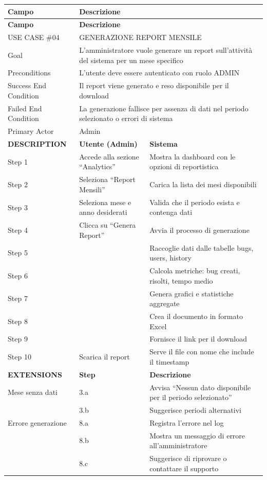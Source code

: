 \begin{longtable}{|p{3cm}|p{7cm}|p{5.5cm}|}
\hline
\textbf{Campo} & \multicolumn{2}{p{12.5cm}|}{\textbf{Descrizione}} \\
\hline
\endfirsthead
\hline
\textbf{Campo} & \multicolumn{2}{p{12.5cm}|}{\textbf{Descrizione}} \\
\hline
\endhead
\hline
\endfoot
\hline
\endlastfoot

USE CASE \#04 & \multicolumn{2}{p{12.5cm}|}{GENERAZIONE REPORT MENSILE} \\
\hline
Goal & \multicolumn{2}{p{12.5cm}|}{L'amministratore vuole generare un report sull'attività del sistema per un mese specifico} \\
\hline
Preconditions & \multicolumn{2}{p{12.5cm}|}{L'utente deve essere autenticato con ruolo ADMIN} \\
\hline
Success End Condition & \multicolumn{2}{p{12.5cm}|}{Il report viene generato e reso disponibile per il download} \\
\hline
Failed End Condition & \multicolumn{2}{p{12.5cm}|}{La generazione fallisce per assenza di dati nel periodo selezionato o errori di sistema} \\
\hline
Primary Actor & \multicolumn{2}{p{12.5cm}|}{Admin} \\
\hline\hline
\textbf{DESCRIPTION} & \textbf{Utente (Admin)} & \textbf{Sistema} \\
\hline
Step 1 & Accede alla sezione ``Analytics'' & Mostra la dashboard con le opzioni di reportistica \\
\hline
Step 2 & Seleziona ``Report Mensili'' & Carica la lista dei mesi disponibili \\
\hline
Step 3 & Seleziona mese e anno desiderati & Valida che il periodo esista e contenga dati \\
\hline
Step 4 & Clicca su ``Genera Report'' & Avvia il processo di generazione \\
\hline
Step 5 & & Raccoglie dati dalle tabelle bugs, users, history \\
\hline
Step 6 & & Calcola metriche: bug creati, risolti, tempo medio \\
\hline
Step 7 & & Genera grafici e statistiche aggregate \\
\hline
Step 8 & & Crea il documento in formato Excel \\
\hline
Step 9 & & Fornisce il link per il download \\
\hline
Step 10 & Scarica il report & Serve il file con nome che include il timestamp \\
\hline\hline
\textbf{EXTENSIONS} & \textbf{Step} & \textbf{Descrizione} \\
\hline
Mese senza dati & 3.a & Avvisa ``Nessun dato disponibile per il periodo selezionato'' \\
\hline
 & 3.b & Suggerisce periodi alternativi \\
\hline
Errore generazione & 8.a & Registra l'errore nel log \\
\hline
 & 8.b & Mostra un messaggio di errore all'amministratore \\
\hline
 & 8.c & Suggerisce di riprovare o contattare il supporto \\
\hline
\end{longtable}
